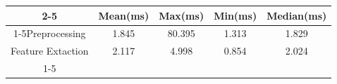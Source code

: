 \documentclass{standalone}
\begin{document}
 
 \begin{tabular}{|c |c |c |c |c |}
\cline{2-5}\cline{2-5} \multicolumn{1}{c |}{ } & Mean(ms) & Max(ms) & Min(ms) & Median(ms)\\ 
\cline{1-5}Preprocessing & 1.845 & 80.395 & 1.313 & 1.829\\ 
 \hhline{|=|=|=|=|=|}Feature Extaction & 2.117 & 4.998 & 0.854 & 2.024\\ 
 \cline{1-5}\hline \end{tabular}
 
\end{document}
